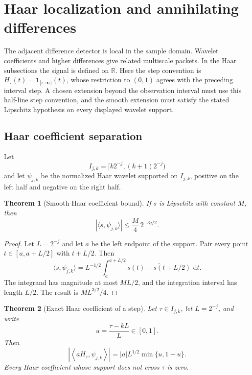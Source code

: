 \documentclass[11pt,a4paper]{article}
\newtheorem{theorem}{Theorem}[section]
\theoremstyle{definition}
\theoremstyle{remark}
\newcommand{\RR}{\mathbb R}
\newcommand{\one}{\mathbf 1}
\newcommand{\dd}{\,\mathrm d}
\begin{document}
\section{Haar localization and annihilating differences}\label{extension:section:10}\label{sec:localization}

The adjacent difference detector is local in the sample domain. Wavelet coefficients and higher differences give related multiscale packets. In the Haar subsections the signal is defined on \(\RR\). Here the step convention is \(H_\tau(t)=\one_{[\tau,\infty)}(t)\), whose restriction to \((0,1)\) agrees with the preceding interval step. A chosen extension beyond the observation interval must use this half-line step convention, and the smooth extension must satisfy the stated Lipschitz hypothesis on every displayed wavelet support.

\subsection{Haar coefficient separation}

Let
\[
I_{j,k}
=
[k2^{-j},(k+1)2^{-j})
\]
and let \(\psi_{j,k}\) be the normalized Haar wavelet supported on \(I_{j,k}\), positive on the left half and negative on the right half.

\begin{theorem}[Smooth Haar coefficient bound]\label{thm:smooth_haar_bound}
If \(s\) is Lipschitz with constant \(M\), then
\[
|\langle s,\psi_{j,k}\rangle|
\leq
\frac M4\,2^{-3j/2}.
\]
\end{theorem}

\begin{proof}
Let \(L=2^{-j}\) and let \(a\) be the left endpoint of the support. Pair every point \(t\in[a,a+L/2]\) with \(t+L/2\). Then
\[
\langle s,\psi_{j,k}\rangle
=
L^{-1/2}
\int_a^{a+L/2}
\overline{s(t)-s(t+L/2)}\,\dd t.
\]
The integrand has magnitude at most \(ML/2\), and the integration interval has length \(L/2\). The result is \(ML^{3/2}/4\).
\end{proof}

\begin{theorem}[Exact Haar coefficient of a step]\label{thm:haar_step_coefficient}
Let \(\tau\in I_{j,k}\), let \(L=2^{-j}\), and write
\[
u=\frac{\tau-kL}{L}\in[0,1].
\]
Then
\[
\left|
\left\langle
 aH_\tau,\psi_{j,k}
\right\rangle
\right|
=
|a|L^{1/2}\min\{u,1-u\}.
\]
Every Haar coefficient whose support does not cross \(\tau\) is zero.
\end{theorem}
\end{document}
